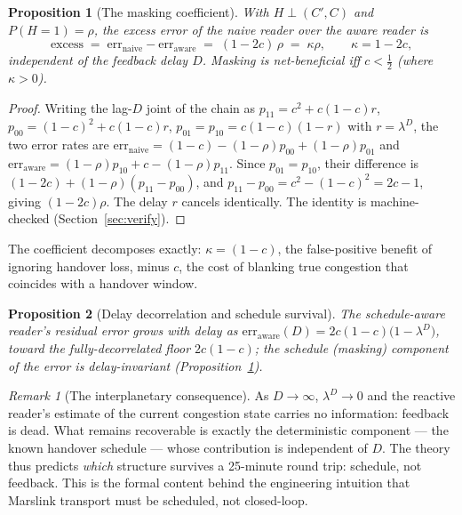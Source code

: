 \documentclass[11pt]{article}
\newtheorem{proposition}{Proposition}
\theoremstyle{definition}
\theoremstyle{remark}
\newtheorem*{remark}{Remark}
\begin{document}
\begin{proposition}[The masking coefficient]
\label{prop:kappa}
With $H\perp(C',C)$ and $P(H{=}1)=\rho$, the excess error of the naive
reader over the aware reader is
\[
  \mathrm{excess} \;=\; \mathrm{err}_{\mathrm{naive}}
     - \mathrm{err}_{\mathrm{aware}} \;=\; (1-2c)\,\rho
     \;=\; \kappa\rho,\qquad \kappa = 1-2c,
\]
independent of the feedback delay $D$. Masking is net-beneficial iff
$c<\tfrac12$ (where $\kappa>0$).
\end{proposition}

\begin{proof}
Writing the lag-$D$ joint of the chain as $p_{11}=c^2+c(1-c)r$,
$p_{00}=(1-c)^2+c(1-c)r$, $p_{01}=p_{10}=c(1-c)(1-r)$ with $r=\lambda^D$,
the two error rates are
$\mathrm{err}_{\mathrm{naive}}=(1-c)-(1-\rho)p_{00}+(1-\rho)p_{01}$ and
$\mathrm{err}_{\mathrm{aware}}=(1-\rho)p_{10}+c-(1-\rho)p_{11}$. Since
$p_{01}=p_{10}$, their difference is
$(1-2c)+(1-\rho)(p_{11}-p_{00})$, and $p_{11}-p_{00}=c^2-(1-c)^2=2c-1$,
giving $(1-2c)\rho$. The delay $r$ cancels identically. The identity is
machine-checked (Section~\ref{sec:verify}).
\end{proof}

The coefficient decomposes exactly: $\kappa=(1-c)$, the false-positive
benefit of ignoring handover loss, minus $c$, the cost of blanking true
congestion that coincides with a handover window.

\begin{proposition}[Delay decorrelation and schedule survival]
\label{prop:delay}
The schedule-aware reader's residual error grows with delay as
$\mathrm{err}_{\mathrm{aware}}(D)=2c(1-c)\big(1-\lambda^{D}\big)$, toward
the fully-decorrelated floor $2c(1-c)$; the schedule (masking) component
of the error is delay-invariant (Proposition~\ref{prop:kappa}).
\end{proposition}

\begin{remark}[The interplanetary consequence]
As $D\to\infty$, $\lambda^D\to0$ and the reactive reader's estimate of the
current congestion state carries no information: feedback is dead. What
remains recoverable is exactly the deterministic component --- the known
handover schedule --- whose contribution is independent of $D$. The
theory thus predicts \emph{which} structure survives a 25-minute round
trip: schedule, not feedback. This is the formal content behind the
engineering intuition that Marslink transport must be scheduled, not
closed-loop.
\end{remark}
\end{document}
